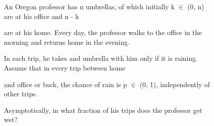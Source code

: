 
\begin{figure}[t]
\centering
\setlength{\columnsep}{12pt}
\setlength{\colw}{\dimexpr(\linewidth-2\columnsep)/3\relax}
\begin{promptrow}
\caret{}\par\vspace{4pt}
An Oregon professor has n umbrellas, of which initially k \(\in\) (0, n) are at his office and n - k\par
  are at his home. Every day, the professor walks to the office in the morning and returns home in the evening.\par
  In each trip, he takes and umbrella with him only if it is raining. Assume that in every trip between home\par
  and office or back, the chance of rain is p \(\in\) (0, 1), independently of other trips.\par
  Asymptotically, in what fraction of his trips does the professor get wet?
\par\vspace{6pt}
{}\par\vspace{3pt}
{\monofont\footnotesize {}}
\end{promptrow}

\vspace{12pt}


\end{figure}
